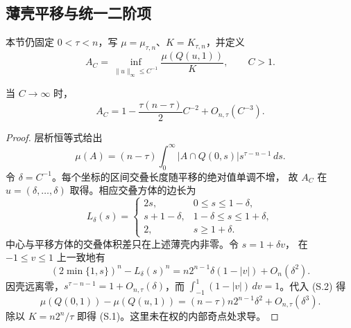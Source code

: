 \subsection{薄壳平移与统一二阶项}\label{subsec:power-second}
本节仍固定 $0<\tau<n$，写 $\mu=\mu_{\tau,n}$、$K=K_{\tau,n}$，并定义
\[A_C=\inf_{\|u\|_\infty\le C^{-1}}\frac{\mu(Q(u,1))}{K},\qquad C>1.\]
\begin{lemma}[平移损失]\label{lem:power-shift}
当 $C\to\infty$ 时，
\[A_C=1-\frac{\tau(n-\tau)}2C^{-2}+O_{n,\tau}(C^{-3}).\tag{S.1}\]
\end{lemma}
\begin{proof}
层析恒等式给出
\[\mu(A)=(n-\tau)\int_0^\infty |A\cap Q(0,s)|s^{\tau-n-1}\,ds.\tag{S.2}\]
令 $\delta=C^{-1}$。每个坐标的区间交叠长度随平移的绝对值单调不增，
故 $A_C$ 在 $u=(\delta,\ldots,\delta)$ 取得。相应交叠方体的边长为
\[L_\delta(s)=\begin{cases}
2s,&0\le s\le1-\delta,\\
s+1-\delta,&1-\delta\le s\le1+\delta,\\
2,&s\ge1+\delta.
\end{cases}\]
中心与平移方体的交叠体积差只在上述薄壳内非零。令 $s=1+\delta v$，
在 $-1\le v\le1$ 上一致地有
\[(2\min\{1,s\})^n-L_\delta(s)^n
=n2^{n-1}\delta(1-|v|)+O_n(\delta^2).\]
因壳远离零，$s^{\tau-n-1}=1+O_{n,\tau}(\delta)$，而
$\int_{-1}^1(1-|v|)\,dv=1$。代入 (S.2) 得
\[\mu(Q(0,1))-\mu(Q(u,1))
=(n-\tau)n2^{n-1}\delta^2+O_{n,\tau}(\delta^3).
\]
除以 $K=n2^n/\tau$ 即得 (S.1)。这里未在权的内部奇点处求导。
\end{proof}

